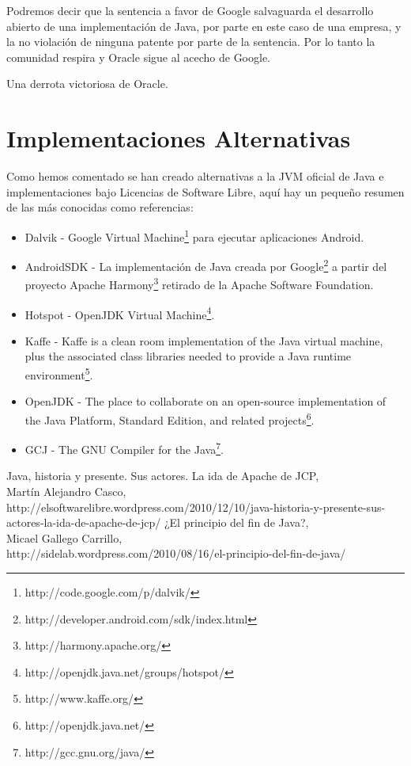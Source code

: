 \documentclass[11pt]{scrartcl}
\begin{document}
Podremos decir que la sentencia a favor de Google salvaguarda el desarrollo abierto de una implementación de Java, por parte en este caso de una empresa, y la no violación de ninguna patente por parte de la sentencia. Por lo tanto la comunidad respira y Oracle sigue al acecho de Google.

Una derrota victoriosa de Oracle.

\section{Implementaciones Alternativas}

Como hemos comentado se han creado alternativas a la JVM oficial de Java e implementaciones bajo Licencias de Software Libre, aquí hay un pequeño resumen de las más conocidas como referencias:
\begin{itemize}
    \item Dalvik - Google Virtual Machine\footnote{http://code.google.com/p/dalvik/} para ejecutar aplicaciones Android.
    \item AndroidSDK - La implementación de Java creada por Google\footnote{http://developer.android.com/sdk/index.html} a partir del proyecto Apache Harmony\footnote{http://harmony.apache.org/} retirado de la Apache Software Foundation.
    \item Hotspot - OpenJDK Virtual Machine\footnote{http://openjdk.java.net/groups/hotspot/}.
    \item Kaffe - Kaffe is a clean room implementation of the Java virtual machine, plus the associated class libraries needed to provide a Java runtime environment\footnote{http://www.kaffe.org/}.
    \item OpenJDK - The place to collaborate on an open-source implementation of the Java Platform, Standard Edition, and related projects\footnote{http://openjdk.java.net/}.
    \item GCJ - The GNU Compiler for the Java\footnote{http://gcc.gnu.org/java/}.
\end{itemize}

\begin{thebibliography}{9}

        Java, historia y presente. Sus actores. La ida de Apache de JCP,\\
        Martín Alejandro Casco,\\
        http://elsoftwarelibre.wordpress.com/2010/12/10/java-historia-y-presente-sus-actores-la-ida-de-apache-de-jcp/
        ¿El principio del fin de Java?,\\
        Micael Gallego Carrillo,\\
        http://sidelab.wordpress.com/2010/08/16/el-principio-del-fin-de-java/
\end{thebibliography}
\end{document}
